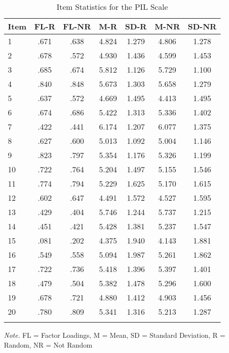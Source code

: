 \documentclass[english,man, mask]{apa6}
\theoremstyle{definition}
\theoremstyle{definition}
\theoremstyle{definition}
\theoremstyle{remark}
\begin{document}
\begin{table}[tbp]
\begin{center}
\begin{threeparttable}
\caption{\label{tab:Ptable}Item Statistics for the PIL Scale}
\begin{tabular}{lcccccc}
\toprule
Item & \multicolumn{1}{c}{FL-R} & \multicolumn{1}{c}{FL-NR} & \multicolumn{1}{c}{M-R} & \multicolumn{1}{c}{SD-R} & \multicolumn{1}{c}{M-NR} & \multicolumn{1}{c}{SD-NR}\\
\midrule
1 & .671 & .638 & 4.824 & 1.279 & 4.806 & 1.278\\
2 & .678 & .572 & 4.930 & 1.436 & 4.599 & 1.453\\
3 & .685 & .674 & 5.812 & 1.126 & 5.729 & 1.100\\
4 & .840 & .848 & 5.673 & 1.303 & 5.658 & 1.279\\
5 & .637 & .572 & 4.669 & 1.495 & 4.413 & 1.495\\
6 & .674 & .686 & 5.422 & 1.313 & 5.336 & 1.402\\
7 & .422 & .441 & 6.174 & 1.207 & 6.077 & 1.375\\
8 & .627 & .600 & 5.013 & 1.092 & 5.004 & 1.146\\
9 & .823 & .797 & 5.354 & 1.176 & 5.326 & 1.199\\
10 & .722 & .764 & 5.204 & 1.497 & 5.155 & 1.546\\
11 & .774 & .794 & 5.229 & 1.625 & 5.170 & 1.615\\
12 & .602 & .647 & 4.491 & 1.572 & 4.527 & 1.595\\
13 & .429 & .404 & 5.746 & 1.244 & 5.737 & 1.215\\
14 & .451 & .421 & 5.428 & 1.381 & 5.237 & 1.547\\
15 & .081 & .202 & 4.375 & 1.940 & 4.143 & 1.881\\
16 & .549 & .558 & 5.094 & 1.987 & 5.261 & 1.862\\
17 & .722 & .736 & 5.418 & 1.396 & 5.397 & 1.401\\
18 & .479 & .504 & 5.382 & 1.478 & 5.296 & 1.600\\
19 & .678 & .721 & 4.880 & 1.412 & 4.903 & 1.456\\
20 & .780 & .809 & 5.341 & 1.316 & 5.213 & 1.287\\
\bottomrule
\addlinespace
\end{tabular}
\begin{tablenotes}[para]
\textit{Note.} FL = Factor Loadings, M = Mean, SD = Standard Deviation, R = Random, NR = Not Random
\end{tablenotes}
\end{threeparttable}
\end{center}
\end{table}
\end{document}
